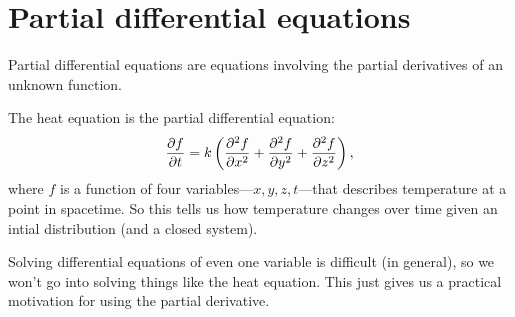\section{Partial differential equations}

Partial differential equations are equations involving the partial derivatives of an unknown function.

\bex
The heat equation is the partial differential equation:
\[ \frac{\partial f}{\partial t} = k\left(\frac{\partial^{2}f}{\partial x^{2}} + \frac{\partial^{2}f}{\partial y^{2}} + \frac{\partial^{2}f}{\partial z^{2}}\right), \]
where $f$ is a function of four variables---$x,y,z,t$---that describes temperature at a point in spacetime. So this tells us how temperature changes over time given an intial distribution (and a closed system). 
\eex

Solving differential equations of even one variable is difficult (in general), so we won't go into solving things like the heat equation. This just gives us a practical motivation for using the partial derivative. 